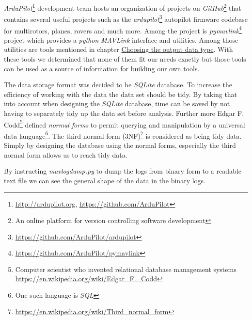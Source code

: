 \documentclass[12pt,oneside]{reedthesis}
\theoremstyle{definition}
\theoremstyle{definition}
\theoremstyle{definition}
\theoremstyle{remark}
\begin{document}
\emph{ArduPilot}\footnote{\url{http://ardupilot.org},
  \url{https://github.com/ArduPilot}} development team hosts an
organization of projects on \emph{GitHub}\footnote{An online platform
  for version controlling software development} that contains several
useful projects such as the \emph{ardupilot}\footnote{\url{https://github.com/ArduPilot/ardupilot}}
autopilot firmware codebase for multirotors, planes, rovers and much
more. Among the project is \emph{pymavlink}\footnote{\url{https://github.com/ArduPilot/pymavlink}}
project which provides a \emph{python} \emph{MAVLink} interface and
utilities. Among those utilities are tools mentioned in chapter
\protect\hyperlink{choosing-the-output-data-type}{Choosing the output
data type}. With these tools we determined that none of them fit our
needs exactly but those tools can be used as a source of information for
building our own tools.

The data storage format was decided to be \emph{SQLite} database. To
increase the efficiency of working with the data the data set should be
tidy. By taking that into account when designing the \emph{SQLite}
database, time can be saved by not having to separately tidy up the data
set before analysis. Further more Edgar F. Codd\footnote{Computer
  scientist who invented relational database management systems
  \url{https://en.wikipedia.org/wiki/Edgar_F._Codd}} defined
\emph{normal} \emph{forms} to permit querying and manipulation by a
universal data language\footnote{One such language is \emph{SQL}}. The
third normal form (3NF)\footnote{\url{https://en.wikipedia.org/wiki/Third_normal_form}}
is considered as being tidy data. Simply by designing the database using
the normal forms, especially the third normal form allows us to reach
tidy data.

By instructing \emph{mavlogdump.py} to dump the logs from binary form to
a readable text file we can see the general shape of the data in the
binary logs.
\end{document}
